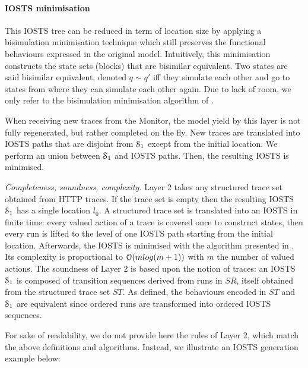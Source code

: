 \paragraph{IOSTS minimisation}

This IOSTS tree can be reduced in term of location size by
applying a bisimulation minimisation technique which still
preserves the functional behaviours expressed in the original
model.  Intuitively, this minimisation constructs the state sets
(blocks) that are bisimilar equivalent. Two states are said
bisimilar equivalent, denoted $q \sim q'$ iff they simulate each
other and go to states from where they can simulate each other
again. Due to lack of room, we only refer to the bisimulation
minimisation algorithm of \cite{Fernandez89animplementation}.

When receiving new traces from the Monitor, the model yield by
this layer is not fully regenerated, but rather completed on the
fly. New traces are translated into IOSTS paths that are disjoint
from $\EuScript{S}_1$ except from the initial location. We
perform an union between $\EuScript{S}_1$ and IOSTS paths. Then,
the resulting IOSTS is minimised.

\textit{Completeness, soundness, complexity.} Layer 2 takes any
structured trace set obtained from HTTP traces. If the trace set
is empty then the resulting IOSTS $\EuScript{S}_1$ has a single
location $l_0$. A structured trace set is translated into an
IOSTS in finite time: every valued action of a trace is covered
once to construct states, then every run is lifted to the level
of one IOSTS path starting from the initial location. Afterwards,
the IOSTS is minimised with the algorithm presented in
\cite{Fernandez89animplementation}. Its complexity is
proportional to $\EuScript{O}(mlog (m+1))$ with $m$ the number of
valued actions. The soundness of Layer 2 is based upon the notion
of traces: an IOSTS $\EuScript{S}_1$ is composed of transition
sequences derived from runs in $SR$, itself obtained from the
structured trace set $ST$. As defined, the behaviours encoded in
$ST$ and $\EuScript{S}_1$ are equivalent since ordered runs are
transformed into ordered IOSTS sequences.

For sake of readability, we do not provide here the rules of
Layer 2, which match the above definitions and algorithms.
Instead, we illustrate an IOSTS generation example below:


